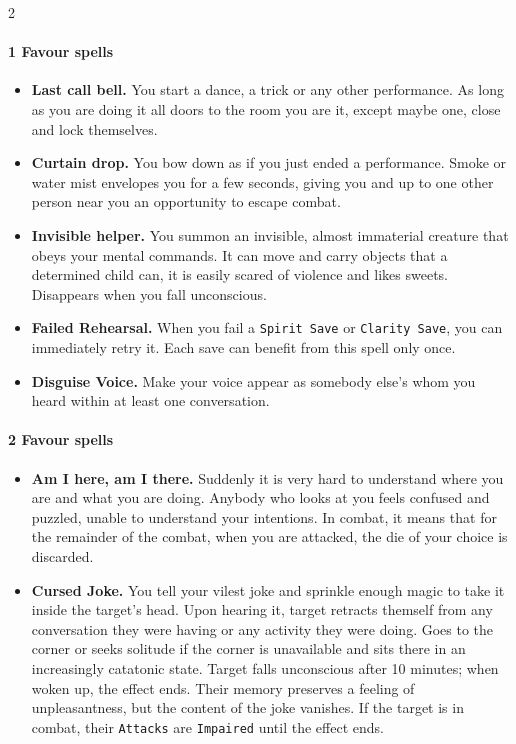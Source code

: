 \documentclass{osr-template/zine}
\begin{document}
\begin{multicols*}{2}
\paragraph{1 Favour spells}
\begin{itemize}[nosep]
    \item[\ding{108}] \textbf{Last call bell.} You start a dance, a trick or any other performance. As long as you are doing it all doors to the room you are it, except maybe one, close and lock themselves.
    \item[\ding{108}] \textbf{Curtain drop.} You bow down as if you just ended a performance. Smoke or water mist envelopes you for a few seconds, giving you and up to one other person near you an opportunity to escape combat.
    \item[\ding{108}] \textbf{Invisible helper.} You summon an invisible, almost immaterial creature that obeys your mental commands. It can move and carry objects that a determined child can, it is easily scared of violence and likes sweets. Disappears when you fall unconscious.
    \item[\ding{108}] \textbf{Failed Rehearsal.} When you fail a \texttt{Spirit Save} or \texttt{Clarity Save}, you can immediately retry it. Each save can benefit from this spell only once.
    \item[\ding{108}] \textbf{Disguise Voice.} Make your voice appear as somebody else's whom you heard within at least one conversation.
\end{itemize}
\paragraph{2 Favour spells}
\begin{itemize}[nosep]
    \item[\ding{108}] \textbf{Am I here, am I there.} Suddenly it is very hard to understand where you are and what you are doing.
 Anybody who looks at you feels confused and puzzled, unable to understand your intentions.
 In combat, it means that for the remainder of the combat, when you are attacked, the die of your choice is discarded.
    \item[\ding{108}] \textbf{Cursed Joke.} You tell your vilest joke and sprinkle enough magic to take it inside the target's head. Upon hearing it, target retracts themself from any conversation they were having or any activity they were doing.
 Goes to the corner or seeks solitude if the corner is unavailable and sits there in an increasingly catatonic state. Target falls unconscious after 10 minutes; when woken up, the effect ends.
 Their memory preserves a feeling of unpleasantness, but the content of the joke vanishes.
 If the target is in combat, their \texttt{Attacks} are \texttt{Impaired} until the effect ends.
\end{itemize}

\end{multicols*}
\end{document}
